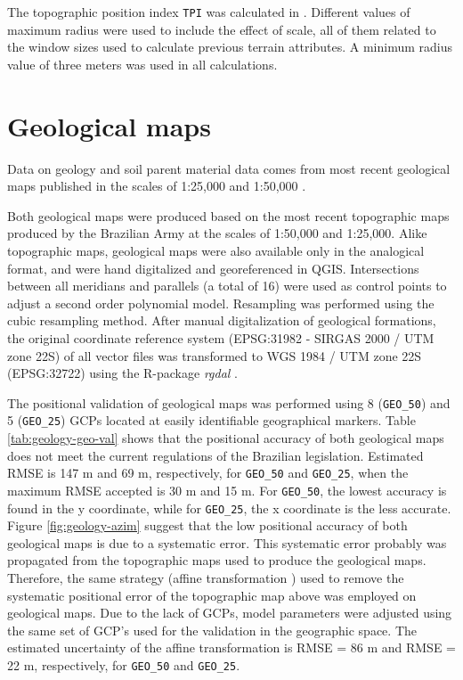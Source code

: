 The topographic position index \texttt{TPI} was calculated in . Different 
values of maximum radius were used to include the effect of scale, all of them related to the window 
sizes used to calculate previous terrain attributes. A minimum radius value of three meters was used 
in all calculations.

\tocless\section{Geological maps}

Data on geology and soil parent material data comes from most recent geological maps published in the scales of 1:25,000 \cite{MacielFilho1990} and 1:50,000 \cite{GasparettoEtAl1988}.

Both geological maps were produced based on the most recent topographic maps produced by the Brazilian Army at the scales of 1:50,000 and 1:25,000. Alike topographic maps, geological maps were also available only in the analogical format, and were hand digitalized and georeferenced in QGIS. Intersections between all meridians and parallels (a total of 16) were used as control points to adjust a second order polynomial model. Resampling was performed using the cubic resampling method. After manual digitalization of geological formations, the original coordinate reference system (EPSG:31982 - SIRGAS 2000 / UTM zone 22S) of all vector files was transformed to WGS 1984 / UTM zone 22S (EPSG:32722) using the R-package \textit{rgdal} \cite{BivandEtAl2013a}.

The positional validation of geological maps was performed using 8 (\texttt{GEO\_50}) and 5 (\texttt{GEO\_25}) GCPs located at easily identifiable geographical markers. Table \ref{tab:geology-geo-val} shows that the positional accuracy of both geological maps does not meet the current regulations of the Brazilian legislation. Estimated RMSE is 147 m and 69 m, respectively, for \texttt{GEO\_50} and \texttt{GEO\_25}, when the maximum RMSE accepted is 30 m and 15 m. For \texttt{GEO\_50}, the lowest accuracy is found in the y coordinate, while for \texttt{GEO\_25}, the x coordinate is the less accurate. Figure \ref{fig:geology-azim} suggest that the low positional accuracy  of both geological maps is due to a systematic error. This systematic error probably was propagated from the topographic maps used to produce the geological maps. Therefore, the same strategy (affine transformation ) used to remove the systematic positional error of the topographic map above was employed on geological maps. Due to the lack of GCPs, model parameters were adjusted using the same set of GCP's used for the validation in the geographic space. The estimated uncertainty of the affine transformation is RMSE = 86 m and RMSE = 22 m, respectively, for \texttt{GEO\_50} and \texttt{GEO\_25}.

